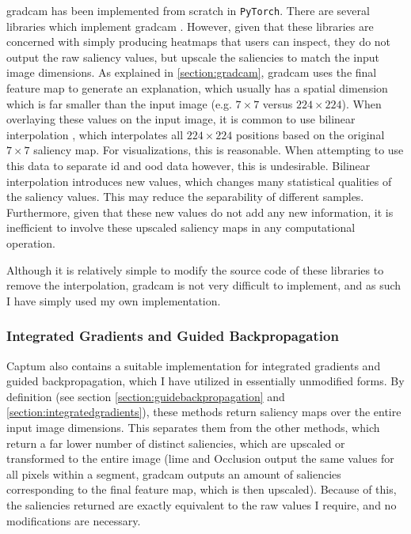 \documentclass[UKenglish]{uiomasterthesis} %
\theoremstyle{definition}
\begin{document}
\ac{gradcam} has been implemented from scratch in \texttt{PyTorch}. There are several libraries which implement \ac{gradcam} \cite{jacobgilpytorchcam, captum}. However, given that these libraries are concerned with simply producing heatmaps that users can inspect, they do not output the raw saliency values, but upscale the saliencies to match the input image dimensions. As explained in \ref{section:gradcam}, \ac{gradcam} uses the final feature map to generate an explanation, which usually has a spatial dimension which is far smaller than the input image (e.g. $7 \times 7$ versus $224 \times 224$). When overlaying these values on the input image, it is common to use bilinear interpolation \cite{jacobgilpytorchcam}, which interpolates all $224 \times 224$ positions based on the original $7 \times 7$ saliency map. For visualizations, this is reasonable. When attempting to use this data to separate \ac{id} and \ac{ood} data however, this is undesirable. Bilinear interpolation introduces new values, which changes many statistical qualities of the saliency values. This may reduce the separability of different samples. Furthermore, given that these new values do not add any new information, it is inefficient to involve these upscaled saliency maps in any computational operation.

Although it is relatively simple to modify the source code of these libraries to remove the interpolation, \ac{gradcam} is not very difficult to implement, and as such I have simply used my own implementation.

\subsubsection{Integrated Gradients and Guided Backpropagation}

Captum also contains a suitable implementation for integrated gradients and guided backpropagation, which I have utilized in essentially unmodified forms. By definition (see section \ref{section:guidebackpropagation} and \ref{section:integratedgradients}), these methods return saliency maps over the entire input image dimensions. This separates them from the other methods, which return a far lower number of distinct saliencies, which are upscaled or transformed to the entire image (\ac{lime} and Occlusion output the same values for all pixels within a segment, \ac{gradcam} outputs an amount of saliencies corresponding to the final feature map, which is then upscaled). Because of this, the saliencies returned are exactly equivalent to the raw values I require, and no modifications are necessary.
\end{document}
